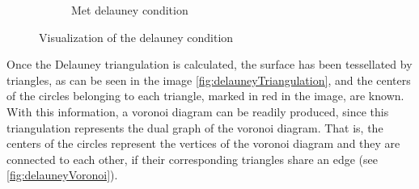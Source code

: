 \begin{center}
\begin{figure}[H]
\begin{subfigure}[b]{0.45\textwidth}
            \caption{Met delauney condition}
            \label{fig:metDelauneyCondition}
        \end{subfigure}
        \caption{Visualization of the delauney condition}
        \label{fig:delauneyCondition}
    \end{figure}
\end{center}

Once the Delauney triangulation is calculated, the surface has been tessellated by triangles, as can be seen in the image \ref{fig:delauneyTriangulation}, and the centers of the circles belonging to each triangle, marked in red in the image, are known. With this information, a voronoi diagram can be readily produced, since this triangulation represents the dual graph of the voronoi diagram. That is, the centers of the circles represent the vertices of the voronoi diagram and they are connected to each other, if their corresponding triangles share an edge (see \ref{fig:delauneyVoronoi}).

